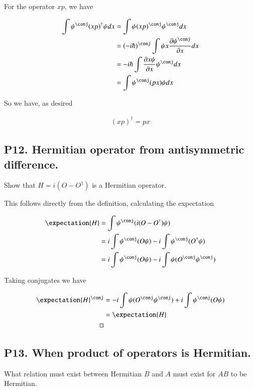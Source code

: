 For the operator $xp$, we have

\begin{align*}
\int \psi^\conj (xp)^\dagger \psi dx 
&= \int \psi (xp)^\conj \psi^\conj dx \\
&= (-i\hbar)^\conj \int \psi x \PD{x}{\psi^\conj} dx \\
&= - i\hbar \int \PD{x}{x \psi} \psi^\conj dx \\
&= \int \psi^\conj (p x) \psi dx \\
\end{align*}

So we have, as desired

\begin{align*}
(xp)^\dagger = p x
\end{align*}

\subsection{P12. Hermitian operator from antisymmetric difference. }

Show that $H = i (O - O^\dagger)$ is a Hermitian operator.

This follows directly from the definition, calculating the expectation

\begin{align*}
\expectation{H} 
&=\int \psi^\conj (i (O - O^\dagger) \psi ) \\
&=
i \int \psi^\conj (O \psi )
-i \int \psi^\conj (O^\dagger \psi ) \\
&=
i \int \psi^\conj (O \psi )
-i \int \psi (O^\conj \psi^\conj) \\
\end{align*}

Taking conjugates we have

\begin{align*}
\expectation{H}^\conj
&=
-i \int \psi (O^\conj \psi^\conj )
+i \int \psi^\conj (O \psi ) \\
&=
\expectation{H} \\
\quad\quad\quad \square
\end{align*}


\subsection{P13. When product of operators is Hermitian. }

What relation must exist between Hermitian $B$ and $A$ must exist for $AB$ to be Hermitian.

